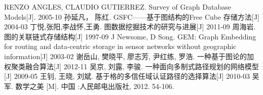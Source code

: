 \documentclass[a4paper]{ecust_thesis_openning}
\begin{document}
\begin{thebibliography}{99}
  \setlength{\itemsep}{-0.4ex}
			 RENZO ANGLES, CLAUDIO GUTIERREZ.  Survey of Graph Database Models[J].  2005-10
			 孙延凡， 陈红.  GSFC——基于图结构的Free Cube 存储方法[J]  2004-03
			 丁悦,张阳,李战怀,王勇.  图数据挖掘技术的研究与进展[J]  2011-09
			 周海岩.  图的关联链式存储结构[J]  1997-09
			 J Newsome, D Song.  GEM: Graph Embedding for routing and data-centric storage in sensor networks without geographic information[J]  2003-02
			谢岳山, 樊晓平, 廖志芳, 尹红练, 罗浩.  一种基于图论的加权聚类融合算法[J]  2012-11
			吴京, 刘露, 李骏.  一种面向多制式路径规划的网络模型[J]  2009-05
			王钊, 王晓, 刘斌.  基于格的多信任域认证路径的选择算法[J]  2010-03
			吴军. 数学之美 [M]. 中国 :人民邮电出版社, 2012. 54-106.
\end{thebibliography}
\end{document}

